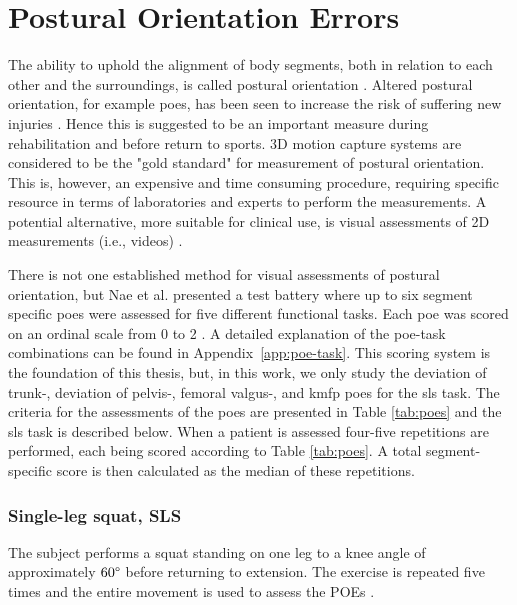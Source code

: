
\section{Postural Orientation Errors}
The ability to uphold the alignment of body segments, both in relation to each other and the surroundings, is called postural orientation \cite{Horak2006}. Altered postural orientation, for example \glspl{poe}, has been seen to increase the risk of suffering new injuries \cite{Hewett2005}. Hence this is suggested to be an important measure during rehabilitation and before return to sports. 3D motion capture systems are considered to be the "gold standard" for measurement of postural orientation. This is, however, an expensive and time consuming procedure, requiring specific resource in terms of laboratories and experts to perform the measurements. A potential alternative, more suitable for clinical use, is visual assessments of 2D measurements (i.e., videos) \cite{Nae2020}.

There is not one established method for visual assessments of postural orientation, but Nae et al. presented a test battery where up to six segment specific \glspl{poe} were assessed for five different functional tasks. Each \gls{poe} was scored on an ordinal scale from 0 to 2 \cite{Nae2017, Nae2020b}.
A detailed explanation of the \gls{poe}-task combinations can be found in Appendix~\ref{app:poe-task}. This scoring system is the foundation of this thesis, but, in this work, we only study the deviation of trunk-, deviation of pelvis-, femoral valgus-, and \gls{kmfp} \glspl{poe} for the \gls{sls} task. The criteria for the assessments of the \glspl{poe} are presented in Table \ref{tab:poes} and the \gls{sls} task is described below. When a patient is assessed four-five repetitions are performed, each being scored according to Table \ref{tab:poes}. A total segment-specific score is then calculated as the median of these repetitions.

\subsubsection{Single-leg squat, SLS} \label{sec:SLS}
The subject performs a squat standing on one leg to a knee angle of approximately $60\degree$ before returning to extension. The exercise is repeated five times and the entire movement is used to assess the POEs \cite{Nae2020}. %


